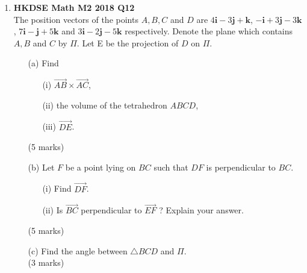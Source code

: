 \documentclass{report}
\begin{document}
\begin{enumerate}
	\item \textbf{HKDSE Math M2 2018 Q12}\\
	The position vectors of the points $A, B, C$ and $D$ are  
	$4\textbf{i} -3 \textbf{j} + \textbf {k}$, 
	$-\textbf{i} +3 \textbf{j} -3 \textbf {k}$, 
	$7\textbf{i} - \textbf{j} +5 \textbf {k}$ and 
	$3\textbf{i} -2 \textbf{j} -5 \textbf {k}$  
	respectively. Denote the plane which contains $A, B$ and $C$ by $\Pi$. Let E be the projection of  $D$ on $\Pi$.
	\begin{enumerate}
		\item [(a)]Find
		\begin{enumerate}
			\item [(i)]$\overrightarrow{AB} \times \overrightarrow{AC}$,
			\item [(ii)]the volume of the tetrahedron $ABCD$,
			\item [(iii)]$\overrightarrow{DE}$.
		\end{enumerate}
		(5 marks)
		\item [(b)]Let $F$ be a point lying on $BC$ such that $DF$ is perpendicular to $BC$.
		\begin{enumerate}
			\item [(i)]Find $\overrightarrow{DF}$. 
			\item [(ii)]Is $\overrightarrow{BC} $ perpendicular to $\overrightarrow{EF}$ ? Explain your answer.
		\end{enumerate}
		(5 marks)
		\item[(c)]Find the angle between $\triangle BCD$ and $\Pi$. \\(3 marks)
	\end{enumerate}

\end{enumerate}
\end{document}
